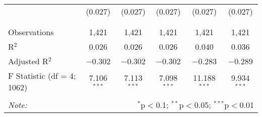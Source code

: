 \begin{table}[!htbp]
\begin{tabular}{@{\extracolsep{5pt}}lccccc}
  & (0.027) & (0.027) & (0.027) & (0.027) & (0.027) \\ 
  & & & & & \\ 
\hline \\[-1.8ex] 
Observations & 1,421 & 1,421 & 1,421 & 1,421 & 1,421 \\ 
R$^{2}$ & 0.026 & 0.026 & 0.026 & 0.040 & 0.036 \\ 
Adjusted R$^{2}$ & $-$0.302 & $-$0.302 & $-$0.302 & $-$0.283 & $-$0.289 \\ 
F Statistic (df = 4; 1062) & 7.106$^{***}$ & 7.113$^{***}$ & 7.098$^{***}$ & 11.188$^{***}$ & 9.934$^{***}$ \\ 
\hline 
\hline \\[-1.8ex] 
\textit{Note:}  & \multicolumn{5}{r}{$^{*}$p$<$0.1; $^{**}$p$<$0.05; $^{***}$p$<$0.01} \\ 
\end{tabular} 
\end{table} 
